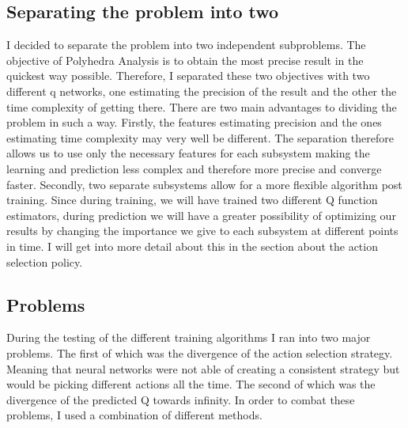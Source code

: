 \subsection{Separating the problem into two}
I decided to separate the problem into two independent subproblems. The objective of Polyhedra Analysis is to obtain the most precise result in the quickest way possible. Therefore, I separated these two objectives with two different q networks, one estimating the precision of the result and the other the time complexity of getting there. There are two main advantages to dividing the problem in such a way. Firstly, the features estimating precision and the ones estimating time complexity may very well be different. The separation therefore allows us to use only the necessary features for each subsystem making the learning and prediction less complex and therefore more precise and converge faster. Secondly, two separate subsystems allow for a more flexible algorithm post training. Since during training, we will have trained two different Q function estimators, during prediction we will have a greater possibility of optimizing our results by changing the importance we give to each subsystem at different points in time. I will get into more detail about this in the section about the action selection policy.\\
\subsection{Problems}
During the testing of the different training algorithms I ran into two major problems. The first of which was the divergence of the action selection strategy. Meaning that neural networks were not able of creating a consistent strategy but would be picking different actions all the time. The second of which was the divergence of the predicted Q towards infinity. In order to combat these problems, I used a combination of different methods.
